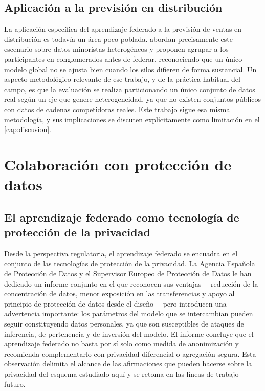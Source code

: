 \subsection{Aplicación a la previsión en distribución}

La aplicación específica del aprendizaje federado a la previsión de ventas en distribución es
todavía un área poco poblada. \textcite{long2025pacfl} abordan precisamente este escenario sobre
datos minoristas heterogéneos y proponen agrupar a los participantes en conglomerados antes de
federar, reconociendo que un único modelo global no se ajusta bien cuando los silos difieren de
forma sustancial. Un aspecto metodológico relevante de ese trabajo, y de la práctica habitual del
campo, es que la evaluación se realiza particionando un único conjunto de datos real según un eje
que genere heterogeneidad, ya que no existen conjuntos públicos con datos de cadenas competidoras
reales. Este trabajo sigue esa misma metodología, y sus implicaciones se discuten explícitamente
como limitación en el \cref{cap:discusion}.

\section{Colaboración con protección de datos}

\subsection{El aprendizaje federado como tecnología de protección de la privacidad}

Desde la perspectiva regulatoria, el aprendizaje federado se encuadra en el conjunto de las
tecnologías de protección de la privacidad. La Agencia Española de Protección de Datos y el
Supervisor Europeo de Protección de Datos le han dedicado un informe conjunto
\parencite{aepdedps2025} en el que reconocen sus ventajas —reducción de la concentración de datos,
menor exposición en las transferencias y apoyo al principio de protección de datos desde el diseño—
pero introducen una advertencia importante: los parámetros del modelo que se intercambian pueden
seguir constituyendo datos personales, ya que son susceptibles de ataques de inferencia, de
pertenencia y de inversión del modelo. El informe concluye que el aprendizaje federado no basta por
sí solo como medida de anonimización y recomienda complementarlo con privacidad diferencial o
agregación segura. Esta observación delimita el alcance de las afirmaciones que pueden hacerse
sobre la privacidad del esquema estudiado aquí y se retoma en las líneas de trabajo futuro.

